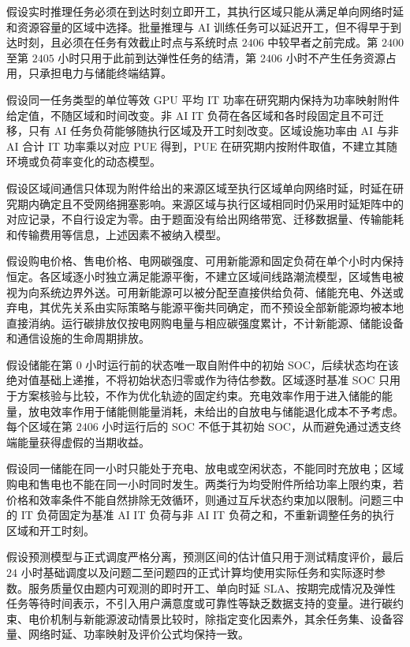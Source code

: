 \documentclass[withoutpreface,bwprint]{cumcmthesis}
\begin{document}
假设实时推理任务必须在到达时刻立即开工，其执行区域只能从满足单向网络时延和资源容量的区域中选择。批量推理与 AI 训练任务可以延迟开工，但不得早于到达时刻，且必须在任务有效截止时点与系统时点 $2406$ 中较早者之前完成。第 $2400$ 至第 $2405$ 小时只用于此前到达弹性任务的结清，第 $2406$ 小时不产生任务资源占用，只承担电力与储能终端结算。

假设同一任务类型的单位等效 GPU 平均 IT 功率在研究期内保持为功率映射附件给定值，不随区域和时间改变。非 AI IT 负荷在各区域和各时段固定且不可迁移，只有 AI 任务负荷能够随执行区域及开工时刻改变。区域设施功率由 AI 与非 AI 合计 IT 功率乘以对应 PUE 得到，PUE 在研究期内按附件取值，不建立其随环境或负荷率变化的动态模型。

假设区域间通信只体现为附件给出的来源区域至执行区域单向网络时延，时延在研究期内确定且不受网络拥塞影响。来源区域与执行区域相同时仍采用时延矩阵中的对应记录，不自行设定为零。由于题面没有给出网络带宽、迁移数据量、传输能耗和传输费用等信息，上述因素不被纳入模型。

假设购电价格、售电价格、电网碳强度、可用新能源和固定负荷在单个小时内保持恒定。各区域逐小时独立满足能源平衡，不建立区域间线路潮流模型，区域售电被视为向系统边界外送。可用新能源可以被分配至直接供给负荷、储能充电、外送或弃电，其优先关系由实际策略与能源平衡共同确定，而不预设全部新能源均被本地直接消纳。运行碳排放仅按电网购电量与相应碳强度累计，不计新能源、储能设备和通信设施的生命周期排放。

假设储能在第 $0$ 小时运行前的状态唯一取自附件中的初始 SOC，后续状态均在该绝对值基础上递推，不将初始状态归零或作为待估参数。区域逐时基准 SOC 只用于方案核验与比较，不作为优化轨迹的固定约束。充电效率作用于进入储能的能量，放电效率作用于储能侧能量消耗，未给出的自放电与储能退化成本不予考虑。每个区域在第 $2406$ 小时运行后的 SOC 不低于其初始 SOC，从而避免通过透支终端能量获得虚假的当期收益。

假设同一储能在同一小时只能处于充电、放电或空闲状态，不能同时充放电；区域购电和售电也不能在同一小时同时发生。两类行为均受附件所给功率上限约束，若价格和效率条件不能自然排除无效循环，则通过互斥状态约束加以限制。问题三中的 IT 负荷固定为基准 AI IT 负荷与非 AI IT 负荷之和，不重新调整任务的执行区域和开工时刻。

假设预测模型与正式调度严格分离，预测区间的估计值只用于测试精度评价，最后 $24$ 小时基础调度以及问题二至问题四的正式计算均使用实际任务和实际逐时参数。服务质量仅由题内可观测的即时开工、单向时延 SLA、按期完成情况及弹性任务等待时间表示，不引入用户满意度或可靠性等缺乏数据支持的变量。进行碳约束、电价机制与新能源波动情景比较时，除指定变化因素外，其余任务集、设备容量、网络时延、功率映射及评价公式均保持一致。
\end{document}
